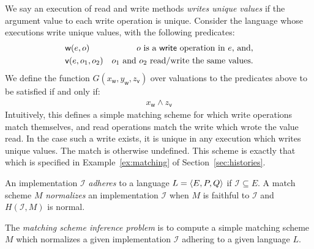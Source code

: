 \begin{example}
  \label{ex:register-language}

  We say an execution of read and write methods \emph{writes unique values} if
  the argument value to each write operation is unique. Consider the language
  whose executions write unique values, with the following predicates:
  \begin{align*}
    & \mathsf{w}(e,o) & \text{$o$ is a {\sf write} operation in $e$, and}, \\
    & \mathsf{v}(e,o_1,o_2) & \text{$o_1$ and $o_2$ read/write the same values.}
  \end{align*}
  We define the function $G(x_\mathsf{w}, y_\mathsf{w}, z_\mathsf{v})$ over
  valuations to the predicates above to be satisfied if and only if:
  \begin{align*}
    x_\mathsf{w} \land z_\mathsf{v}
  \end{align*}
  Intuitively, this defines a simple matching scheme for which write
  operations match themselves, and read operations match the write which wrote
  the value read. In the case such a write exists, it is unique in any
  execution which writes unique values. The match is otherwise undefined. This
  scheme is exactly that which is specified in Example~\ref{ex:matching} of
  Section~\ref{sec:histories}.

\end{example}

An implementation $\mathcal{I}$ \emph{adheres} to a language $L = {\left\langle{E,P,Q}\right\rangle}$
if $\mathcal{I} \subseteq E$. A match scheme $M$ \emph{normalizes} an
implementation $\mathcal{I}$ when $M$ is faithful to $\mathcal{I}$ and
$H(\mathcal{I},M)$ is normal.

\begin{definition}

  The \emph{matching scheme inference problem} is to compute a simple matching
  scheme $M$ which normalizes a given implementation $\mathcal{I}$ adhering to
  a given language $L$.

\end{definition}

